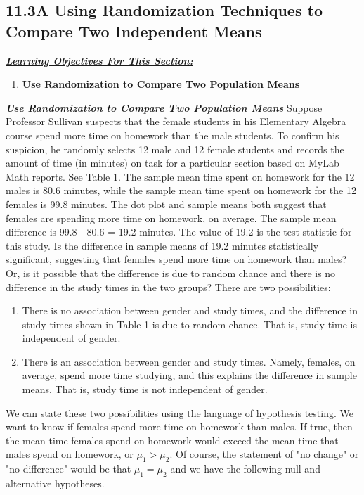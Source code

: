 \documentclass{report}
\begin{document}
    \subsection*{11.3A Using Randomization Techniques to Compare Two Independent Means}
    \bigbreak \noindent 
    \bigbreak \noindent 
    \textbf{\textit{\underline{Learning Objectives For This Section:}}}
    \begin{enumerate}
        \item \textbf{Use Randomization to Compare Two Population Means}
    \end{enumerate}
    \bigbreak \noindent \bigbreak \noindent 
    \textbf{\textit{\underline{ Use Randomization to Compare Two Population Means}}}
    \bigbreak \noindent 
    Suppose Professor Sullivan suspects that the female students in his Elementary Algebra course spend more time on homework than the male students. To confirm his suspicion, he randomly selects 12 male and 12 female students and records the amount of time (in minutes) on task for a particular section based on MyLab Math reports. See Table 1.
    \bigbreak \noindent 
    The sample mean time spent on homework for the 12 males is 80.6 minutes, while the sample mean time spent on homework for the 12 females is 99.8 minutes. The dot plot and sample means both suggest that females are spending more time on homework, on average. The sample mean difference is 99.8 - 80.6 = 19.2 minutes. The value of 19.2 is the test statistic for this study. 
    \bigbreak \noindent 
    Is the difference in sample means of 19.2 minutes statistically significant, suggesting that females spend more time on homework than males? Or, is it possible that the difference is due to random chance and there is no difference in the study times in the two groups? There are two possibilities:
    \begin{enumerate}
        \item There is no association between gender and study times, and the difference in study times shown in Table 1 is due to random chance. That is, study time is independent of gender.
        \item There is an association between gender and study times. Namely, females, on average, spend more time studying, and this explains the difference in sample means. That is, study time is not independent of gender.
    \end{enumerate}
    \bigbreak \noindent 
    We can state these two possibilities using the language of hypothesis testing. We want to know if females spend more time on homework than males. If true, then the mean time females spend on homework would exceed the mean time that males spend on homework, or $\mu_{1}> \mu_{2}$. Of course, the statement of "no change" or "no difference" would be that $\mu_{1} = \mu_{2} $ and we have the following null and alternative hypotheses.
\end{document}

